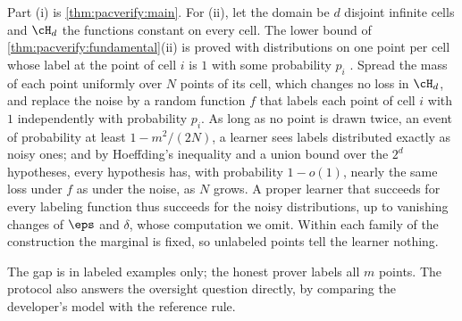 \begin{refsection}

\begin{proofsketch}
Part (i) is \cref{thm:pacverify:main}. For (ii), let the domain be $d$ disjoint infinite cells and $\cH_d$ the functions constant on every cell. The lower bound of \cref{thm:pacverify:fundamental}(ii) is proved with distributions on one point per cell whose label at the point of cell $i$ is $1$ with some probability $p_i$ \parencite[Section~28.2]{ShalevShwartzBenDavid2014}. Spread the mass of each point uniformly over $N$ points of its cell, which changes no loss in $\cH_d$, and replace the noise by a random function $f$ that labels each point of cell $i$ with $1$ independently with probability $p_i$. As long as no point is drawn twice, an event of probability at least $1-m^2/(2N)$, a learner sees labels distributed exactly as noisy ones; and by Hoeffding's inequality and a union bound over the $2^d$ hypotheses, every hypothesis has, with probability $1-o(1)$, nearly the same loss under $f$ as under the noise, as $N$ grows. A proper learner that succeeds for every labeling function thus succeeds for the noisy distributions, up to vanishing changes of $\eps$ and $\delta$, whose computation we omit. Within each family of the construction the marginal is fixed, so unlabeled points tell the learner nothing.
\end{proofsketch}

The gap is in labeled examples only; the honest prover labels all $m$ points. The protocol also answers the oversight question directly, by comparing the developer's model with the reference rule.


\end{refsection}
